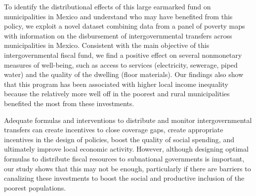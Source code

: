 \documentclass[dv_diss_main.tex]{subfiles}
\begin{document}
To identify the distributional effects of this large  earmarked fund on municipalities in Mexico and understand who may have benefited from this policy, we exploit a novel dataset combining data from a panel of poverty maps with information on the disbursement of intergovernmental transfers across municipalities in Mexico. Consistent with the main objective of this intergovernmental fiscal fund, we find a positive effect on several nonmonetary measures of well-being, such as access to services (electricity, sewerage, piped water) and the quality of the dwelling (floor materials). Our findings also show that this program has been associated with higher local income inequality because the relatively more well off in the poorest and rural municipalities benefited the most from these investments.

Adequate formulas and interventions to distribute and monitor intergovernmental transfers can create incentives to close coverage gaps, create appropriate incentives in the design of policies, boost the quality of social spending, and ultimately improve local economic activity. However, although designing optimal formulas to distribute fiscal resources to subnational governments is important, our study shows that this may not be enough, particularly if there are barriers to canalizing these investments to boost the social and productive inclusion of the poorest populations.
\end{document}
